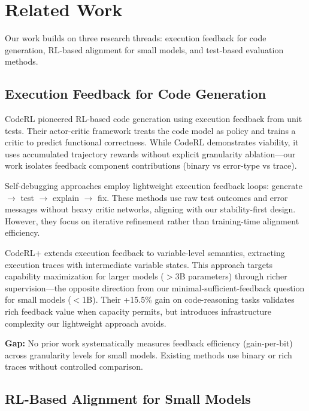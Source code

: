 \section{Related Work}

Our work builds on three research threads: execution feedback for code generation, RL-based alignment for small models, and test-based evaluation methods.

\subsection{Execution Feedback for Code Generation}

CodeRL \cite{le2022coderl} pioneered RL-based code generation using execution feedback from unit tests. Their actor-critic framework treats the code model as policy and trains a critic to predict functional correctness. While CodeRL demonstrates viability, it uses accumulated trajectory rewards without explicit granularity ablation---our work isolates feedback component contributions (binary vs error-type vs trace).

Self-debugging approaches \cite{chen2023teaching} employ lightweight execution feedback loops: generate $\rightarrow$ test $\rightarrow$ explain $\rightarrow$ fix. These methods use raw test outcomes and error messages without heavy critic networks, aligning with our stability-first design. However, they focus on iterative refinement rather than training-time alignment efficiency.

CodeRL+ \cite{jiang2025coderl} extends execution feedback to variable-level semantics, extracting execution traces with intermediate variable states. This approach targets capability maximization for larger models ($>$3B parameters) through richer supervision---the opposite direction from our minimal-sufficient-feedback question for small models ($<$1B). Their +15.5\% gain on code-reasoning tasks validates rich feedback value when capacity permits, but introduces infrastructure complexity our lightweight approach avoids.

\textbf{Gap:} No prior work systematically measures feedback efficiency (gain-per-bit) across granularity levels for small models. Existing methods use binary \cite{skopin2026rlvr} or rich traces \cite{jiang2025coderl} without controlled comparison.

\subsection{RL-Based Alignment for Small Models}

